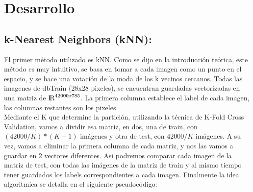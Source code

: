 \section{Desarrollo}
\subsection{k-Nearest Neighbors (kNN):}
El primer método utilizado es kNN. Como se dijo en la introducción teórica, este método es muy intuitivo, se basa en tomar a cada imagen como un punto en el espacio, y se hace una votación de la moda de los k vecinos cercanos. Todas las imagenes de dbTrain (28x28 pixeles), se encuentran guardadas vectorizadas en una matriz de ${\rm I\!R}^{42000x785}$. La primera columna establece el label de cada imagen, las columnas restantes son los pixeles.\\
Mediante el K que determine la partición, utilizando la técnica de K-Fold Cross Validation, vamos a dividir esa matriz, en dos, una de train, con $(42000/K)*(K-1)$ imágenes y otra de test, con $42000/K$ imágenes. A su vez, vamos a eliminar la primera columna de cada matriz, y nos las vamos a guardar en 2 vectores diferentes. Asi podremos comparar cada imagen de la matriz de test, con todas las imágenes de la matriz de train y al mismo tiempo tener guardados los labels correspondientes a cada imagen. Finalmente la idea algoritmica se detalla en el siguiente pseudocódigo:\\
